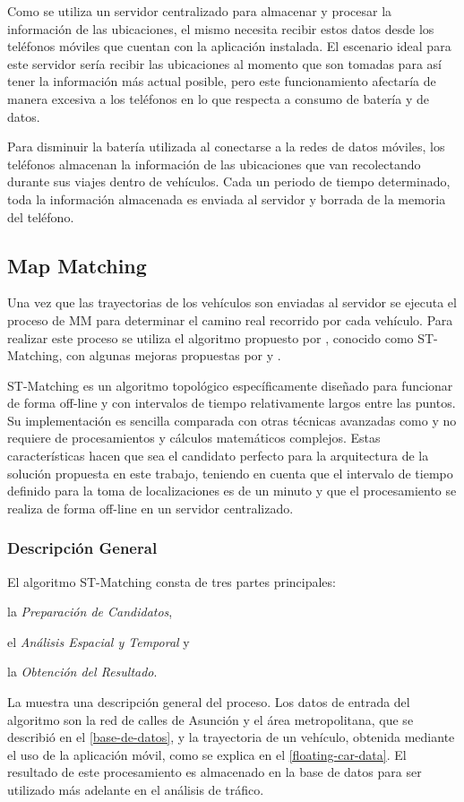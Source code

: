 Como se utiliza un servidor centralizado para almacenar y procesar la información de las ubicaciones, el mismo necesita recibir estos datos desde los teléfonos móviles que cuentan con la aplicación instalada. El escenario ideal para este servidor sería recibir las ubicaciones al momento que son tomadas para así tener la información más actual posible, pero este funcionamiento afectaría de manera excesiva a los teléfonos en lo que respecta a consumo de batería y de datos.

Para disminuir la batería utilizada al conectarse a la redes de datos móviles, los teléfonos almacenan la información de las ubicaciones que van recolectando durante sus viajes dentro de vehículos. Cada un periodo de tiempo determinado, toda la información almacenada es enviada al servidor y borrada de la memoria del teléfono.

\subsection{Map Matching}

Una vez que las trayectorias de los vehículos son enviadas al servidor se ejecuta el proceso de MM para determinar el camino real recorrido por cada vehículo. Para realizar este proceso se utiliza el algoritmo propuesto por \cite{lou2009map}, conocido como ST-Matching, con algunas mejoras propuestas por \cite{budigm2012algorithm} y \cite{sakic2012map}. 

ST-Matching es un algoritmo topológico específicamente diseñado para funcionar de forma off-line y con intervalos de tiempo relativamente largos entre las puntos. Su implementación es sencilla comparada con otras técnicas avanzadas como \cite{quddus2006high, newson2009hidden} y no requiere de procesamientos y cálculos matemáticos complejos. Estas características hacen que sea el candidato perfecto para la arquitectura de la solución propuesta en este trabajo, teniendo en cuenta que el intervalo de tiempo definido para la toma de localizaciones es de un minuto y que el procesamiento se realiza de forma off-line en un servidor centralizado. 

\subsubsection{Descripción General}

El algoritmo ST-Matching consta de tres partes principales: \begin{enumerate*}[a)]
\item la \emph{Preparación de Candidatos},
\item el \emph{Análisis Espacial y Temporal} y
\item la \emph{Obtención del Resultado}.
\end{enumerate*}
La  muestra una descripción general del proceso. Los datos de entrada del algoritmo son la red de calles de Asunción y el área metropolitana, que se describió en el \cref{base-de-datos}, y la trayectoria de un vehículo, obtenida mediante el uso de la aplicación móvil, como se explica en el \cref{floating-car-data}. El resultado de este procesamiento es almacenado en la base de datos para ser utilizado más adelante en el análisis de tráfico.

